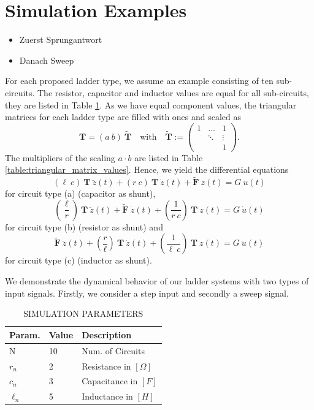 \section{Simulation Examples}
{
	\color{red}
\begin{itemize}
	\item Zuerst Sprungantwort
	\item Danach Sweep
\end{itemize}
}

For each proposed ladder type, we assume an example consisting of ten sub-circuits. The resistor, capacitor and inductor values  are equal for all sub-circuits, they are listed in Table \ref{table:simulation_parameters}. As we have equal component values, the triangular matrices for each ladder type are filled with ones and scaled as
\begin{equation*}
	\mathbf{T} = \left(a~b\right) ~ \mathbf{\tilde{T}} \quad \text{with} \quad 
	\mathbf{\tilde{T}} :=
	\begin{pmatrix}
		1 & \ldots & 1 \\
		& \ddots & \vdots \\
		& & 1
	\end{pmatrix} 
	\textbf{.}
\end{equation*}
The multipliers of the scaling $a\cdot b$ are listed in Table \ref{table:triangular_matrix_values}. Hence, we yield the differential equations
\begin{equation}
	(\ell~c)~\mathbf{T} ~ \ddot{z}(t) + (r~c)~\mathbf{T}~ \dot{z}(t) + \mathbf{\tilde{F}}~ z(t) = G~u(t)
\end{equation}
for circuit type (a) (capacitor as shunt), 
\begin{equation}
	\left(\frac{\ell}{r}\right)~\mathbf{T}~ \ddot{z}(t) + \mathbf{\tilde{F}}~\dot{z}(t) + \left(\frac{1}{r~c}\right)~\mathbf{T}~ z(t) = G~\dot{u}(t)
\end{equation}
for circuit type (b) (resistor as shunt) and
\begin{equation}
	\mathbf{\tilde{F}}~ \ddot{z}(t) + \left(\frac{r}{\ell}\right) ~ \mathbf{T} ~ \dot{z}(t) + \left(\frac{1}{\ell~c}\right) ~ \mathbf{T} ~ z(t) = G~\ddot{u}(t)
\end{equation}
for circuit type (c) (inductor as shunt). 

We demonstrate the dynamical behavior of our ladder systems with two types of input signals. Firstly, we consider a step input and secondly a sweep signal.

\begin{table}[b]
	\renewcommand{\arraystretch}{1.3}
	\centering
	\caption{\MakeUppercase{Simulation Parameters}}
	\begin{tabular}{l l l}
		\toprule
		Param. & Value & Description \\
		\midrule
		N & 10 & Num. of Circuits\\
		$r_{n}$ & 2 & Resistance in $[\Omega]$ \\
		$c_{n}$ & 3 & Capacitance in $[F]$\\
		$\ell_{n}$ & 5 & Inductance in $[H]$\\
		\bottomrule
	\end{tabular}
	\label{table:simulation_parameters}
\end{table}


